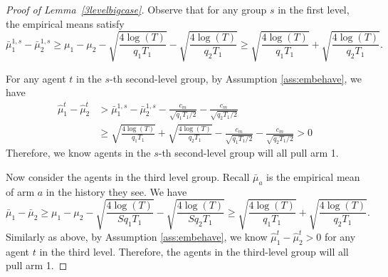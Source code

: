 \begin{proof}[Proof of Lemma~\ref{3levelbigcase}]
  Observe that for any group $s$ in the first level, the empirical
  means satisfy
\[
\bar{\mu}_1^{1,s} - \bar{\mu}_2^{1,s} \geq \mu_1 -\mu_2 - \sqrt{\frac{4\log(T)}{q_1T_1}} - \sqrt{\frac{4\log(T)}{q_2T_1}} \geq  \sqrt{\frac{4\log(T)}{q_1T_1}} + \sqrt{\frac{4\log(T)}{q_2T_1}}.
\]


For any agent $t$ in the $s$-th second-level group, by Assumption \ref{ass:embehave}, we have
\begin{align*}
\hat{\mu}_1^t - \hat{\mu}_2^t &>\bar{\mu}_1^{1,s} - \bar{\mu}_2^{1,s} - \frac{c_m}{\sqrt{q_1T_1/2}} - \frac{c_m}{\sqrt{q_2T_1/2}}\\
&\geq  \sqrt{\frac{4\log(T)}{q_1T_1}} + \sqrt{\frac{4\log(T)}{q_2T_1}}- \frac{c_m}{\sqrt{q_1T_1/2}} - \frac{c_m}{\sqrt{q_2T_1/2}} > 0
\end{align*}
Therefore, we know agents in the $s$-th second-level group will all pull arm 1.

Now consider the agents in the third level group. Recall $\bar{\mu}_a$
is the empirical mean of arm $a$ in the history they see. We have
\[
\bar{\mu}_1 - \bar{\mu}_2 \geq \mu_1 -\mu_2 - \sqrt{\frac{4\log(T)}{Sq_1T_1}} - \sqrt{\frac{4\log(T)}{Sq_2T_1}} \geq  \sqrt{\frac{4\log(T)}{q_1T_1}} 
+ \sqrt{\frac{4\log(T)}{q_2T_1}}.
\]
Similarly as above, by Assumption \ref{ass:embehave}, we know
$\hat{\mu}_1^t - \hat{\mu}_2^t > 0$ for any agent $t$ in the third
level. Therefore, the agents in the third-level group will all pull
arm 1.  
\end{proof}



